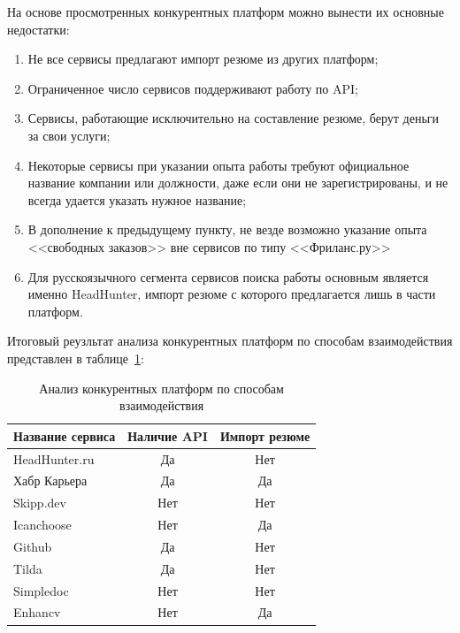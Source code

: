 \documentclass[master, och, diploma]{SCWorks}
\begin{document}
На основе просмотренных конкурентных платформ можно вынести их основные недостатки:
\begin{enumerate}
    \item Не все сервисы предлагают импорт резюме из других платформ;
    \item Ограниченное число сервисов поддерживают работу по API;
    \item Сервисы, работающие исключительно на составление резюме, берут деньги за свои услуги;
    \item Некоторые сервисы при указании опыта работы требуют официальное название компании или должности, даже если они не зарегистрированы, и не всегда удается указать нужное название;
    \item В дополнение к предыдущему пункту, не везде возможно указание опыта <<свободных заказов>> вне сервисов по типу <<Фриланс.ру>>
    \item Для русскоязычного сегмента сервисов поиска работы основным является именно HeadHunter, импорт резюме с которого предлагается лишь в части платформ.
\end{enumerate}

Итоговый реузльтат анализа конкурентных платформ по способам взаимодействия представлен в таблице~\ref{tab:1}:

\begin{table}[!ht]
    \centering
    \begin{tabular}[c]{l|cc}
        Название сервиса    & Наличие API   & Импорт резюме \\[2mm]\hline
        HeadHunter.ru       & Да            & Нет \\
        Хабр Карьера        & Да            & Да \\
        Skipp.dev           & Нет           & Нет \\
        Icanchoose          & Нет           & Да \\
        Github              & Да            & Нет \\
        Tilda               & Да            & Нет \\
        Simpledoc           & Нет           & Нет \\
        Enhancv             & Нет           & Да \\
    \end{tabular}

    \captionsetup{justification=centering,margin=2cm}
    \caption{\label{tab:1}%
        Анализ конкурентных платформ по способам взаимодействия}
\end{table}
\end{document}
